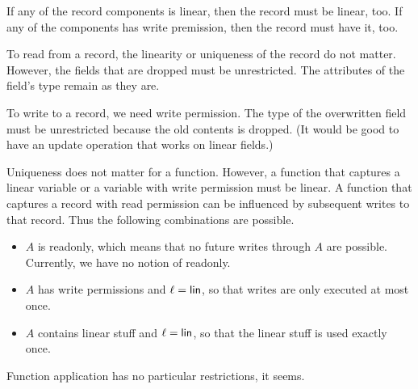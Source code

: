 \documentclass{llncs}
\begin{document}
If any of the record components is linear, then the record must be linear, too.
If any of the components has write premission, then the record must have it, too.
\begin{mathpar}
\end{mathpar}
To read from a record, the linearity or uniqueness of the record do not matter. However, the fields that are dropped must be unrestricted. The attributes of the field's type remain as they are.
\begin{mathpar}
\end{mathpar}
To write to a record, we need write permission. The type of the overwritten field must be unrestricted because the old contents is dropped. (It would be good to have an update operation that works on linear fields.)
\begin{mathpar}
\end{mathpar}

\begin{mathpar}
\end{mathpar}
Uniqueness does not matter for a function. However, a function that captures a linear variable or a variable with write permission must be linear. A function that captures a record with read permission can be influenced by subsequent writes to that record. Thus the following combinations are possible.
\begin{itemize}
\item $A$ is readonly, which means that no future writes through $A$ are possible. Currently, we have no notion of readonly.
\item $A$ has write permissions and $\ell = \LIN$, so that writes are only executed at most once.
\item $A$ contains linear stuff and $\ell = \LIN$, so that the linear stuff is used exactly once.
\end{itemize}
\begin{mathpar}
\end{mathpar}
Function application has no particular restrictions, it seems.
\begin{mathpar}
\end{mathpar}
\end{document}
